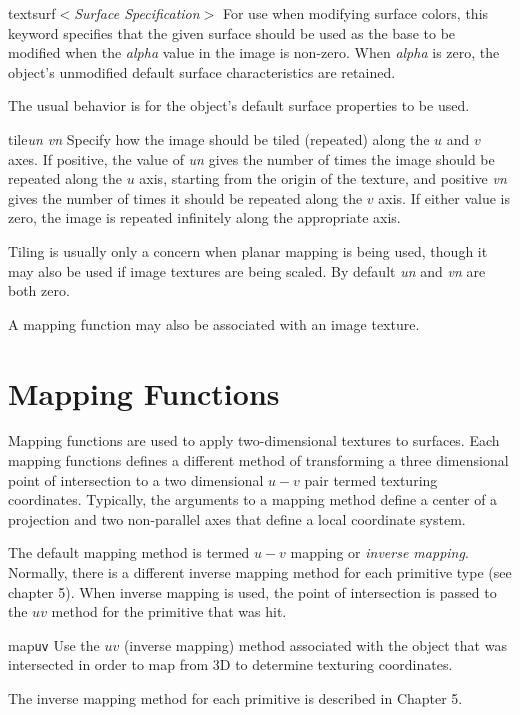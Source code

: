 \begin{defkey}{textsurf}{$<${\em Surface Specification}$>$}
	For use when modifying surface colors, this keyword specifies
	that the given surface should be used as the base
	to be modified when the {\em alpha} value in the image
	is non-zero.  When {\em alpha} is zero, the object's
	unmodified default surface characteristics are retained.
\end{defkey}
The usual behavior is for the object's default surface properties to
be used.

\begin{defkey}{tile}{{\em un vn}}
	Specify how the image should be tiled (repeated) along the
	$u$ and $v$ axes.
	If positive, the value of {\em un} gives the number of
	times the image should be repeated along the $u$ axis, starting
	from the origin of the texture, and positive {\em vn} gives the
	number of times it
	should be repeated along the $v$ axis.  If either value is zero,
	the image is repeated infinitely along the appropriate axis.
\end{defkey}
Tiling is usually only a concern when planar mapping is being used,
though it may also be used if image textures are being scaled.  By default
{\em un} and {\em vn} are both zero.
 

A mapping function may also be associated with an image texture.

\section {Mapping Functions}

Mapping functions are used to apply two-dimensional textures to
surfaces.  Each mapping functions defines a different method of transforming
a three dimensional point of intersection to a two dimensional $u-v$ pair
termed texturing coordinates.
Typically, the arguments to a mapping method define a center of
a projection and two non-parallel axes that define a local coordinate system.

The default mapping method is termed $u-v$ mapping or {\em inverse mapping}.
Normally, there is a different inverse mapping method for each primitive type
(see chapter 5).
When inverse mapping is used, the point of intersection is passed to
the $uv$ method for the primitive that was hit.

\begin{defkey}{map}{{\tt uv}}
	Use the $uv$ (inverse mapping) method associated with the
	object that was intersected in order to map from 3D to determine
	texturing coordinates.
\end{defkey}
The inverse mapping method for each primitive is described in Chapter 5.

